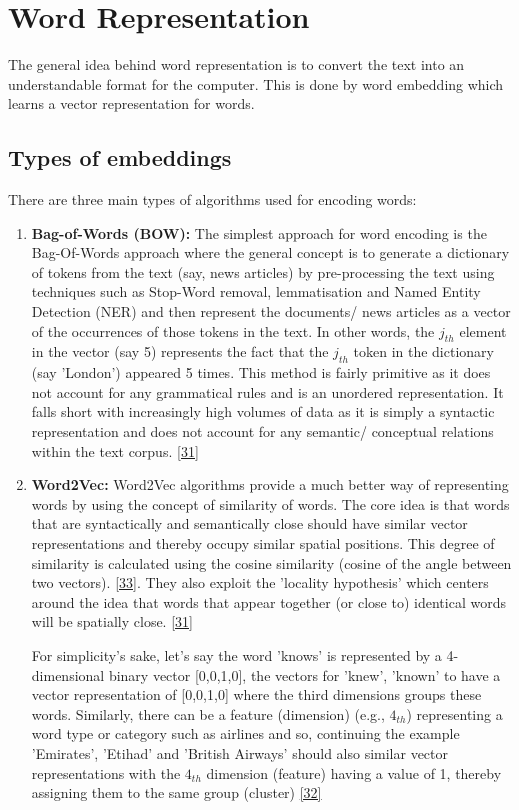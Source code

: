 \section{Word Representation}

The general idea behind word representation is to convert the text into an understandable format for the computer. This is done by word embedding which learns a vector representation for words.

\subsection{Types of embeddings}

There are three main types of algorithms used for encoding words: 

\begin{enumerate}
    \item \textbf{Bag-of-Words (BOW):} The simplest approach for word encoding is the Bag-Of-Words approach where the general concept is to generate a dictionary of tokens from the text (say, news articles) by pre-processing the text using techniques such as Stop-Word removal, lemmatisation and Named Entity Detection (NER) and then represent the documents/ news articles as a vector of the occurrences of those tokens in the text. In other words, the $j_{th}$ element in the vector (say 5) represents the fact that the $j_{th}$ token in the dictionary (say 'London') appeared 5 times. This method is fairly primitive as it does not account for any grammatical rules and is an unordered representation. It falls short with increasingly high volumes of data as it is simply a syntactic representation and does not account for any semantic/ conceptual relations within the text corpus. \hyperlink{31}{[31]} 
    
    \item \textbf{Word2Vec:} Word2Vec algorithms provide a much better way of representing words by using the concept of similarity of words. The core idea is that words that are syntactically and semantically close should have similar vector representations and thereby occupy similar spatial positions. This degree of similarity is calculated using the cosine similarity (cosine of the angle between two vectors). \hyperlink{33}{[33]}. They also exploit the 'locality hypothesis' which centers around the idea that words that appear together (or close to) identical words will be spatially close. \hyperlink{31}{[31]} 

For simplicity's sake, let's say the word 'knows' is represented by a 4-dimensional binary vector [0,0,1,0], the vectors for 'knew', 'known' to have a vector representation of [0,0,1,0] where the third dimensions groups these words. Similarly, there can be a feature (dimension) (e.g., $4_{th}$) representing a word type or category such as airlines and so, continuing the example 'Emirates', 'Etihad' and 'British Airways' should also similar vector representations with the $4_{th}$ dimension (feature) having a value of 1, thereby assigning them to the same group (cluster)  \hyperlink{32}{[32]}


\end{enumerate}
